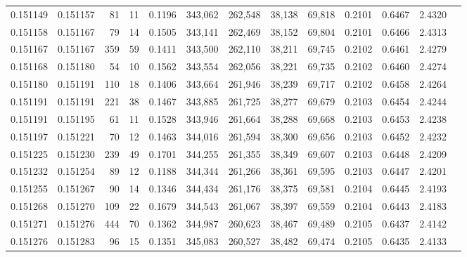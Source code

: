 \begin{tabular}{rrrrrrrrrrrrr}
0.151149 & 0.151157 &    81 &  11 &                                     0.1196 & 343,062 & 262,548 &  38,138 &  69,818 & 0.2101 & 0.6467 & 2.4320 \\
0.151158 & 0.151167 &    79 &  14 &                                     0.1505 & 343,141 & 262,469 &  38,152 &  69,804 & 0.2101 & 0.6466 & 2.4313 \\
0.151167 & 0.151167 &   359 &  59 &                                     0.1411 & 343,500 & 262,110 &  38,211 &  69,745 & 0.2102 & 0.6461 & 2.4279 \\
0.151168 & 0.151180 &    54 &  10 &                                     0.1562 & 343,554 & 262,056 &  38,221 &  69,735 & 0.2102 & 0.6460 & 2.4274 \\
0.151180 & 0.151191 &   110 &  18 &                                     0.1406 & 343,664 & 261,946 &  38,239 &  69,717 & 0.2102 & 0.6458 & 2.4264 \\
0.151191 & 0.151191 &   221 &  38 &                                     0.1467 & 343,885 & 261,725 &  38,277 &  69,679 & 0.2103 & 0.6454 & 2.4244 \\
0.151191 & 0.151195 &    61 &  11 &                                     0.1528 & 343,946 & 261,664 &  38,288 &  69,668 & 0.2103 & 0.6453 & 2.4238 \\
0.151197 & 0.151221 &    70 &  12 &                                     0.1463 & 344,016 & 261,594 &  38,300 &  69,656 & 0.2103 & 0.6452 & 2.4232 \\
0.151225 & 0.151230 &   239 &  49 &                                     0.1701 & 344,255 & 261,355 &  38,349 &  69,607 & 0.2103 & 0.6448 & 2.4209 \\
0.151232 & 0.151254 &    89 &  12 &                                     0.1188 & 344,344 & 261,266 &  38,361 &  69,595 & 0.2103 & 0.6447 & 2.4201 \\
0.151255 & 0.151267 &    90 &  14 &                                     0.1346 & 344,434 & 261,176 &  38,375 &  69,581 & 0.2104 & 0.6445 & 2.4193 \\
0.151268 & 0.151270 &   109 &  22 &                                     0.1679 & 344,543 & 261,067 &  38,397 &  69,559 & 0.2104 & 0.6443 & 2.4183 \\
0.151271 & 0.151276 &   444 &  70 &                                     0.1362 & 344,987 & 260,623 &  38,467 &  69,489 & 0.2105 & 0.6437 & 2.4142 \\
0.151276 & 0.151283 &    96 &  15 &                                     0.1351 & 345,083 & 260,527 &  38,482 &  69,474 & 0.2105 & 0.6435 & 2.4133 \\

\end{tabular}
